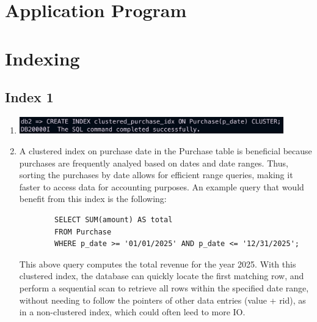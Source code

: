\documentclass[a4paper,11pt]{article}
\begin{document}
\section*{Application Program}

\section*{Indexing}

\subsection*{Index 1}

\begin{enumerate}[label=(\alph*)]
    \item \includegraphics[width=0.9\textwidth]{images/idx1.png}
    \item A clustered index on purchase date in the Purchase table is beneficial because purchases are frequently analyed based on dates and date ranges. 
    Thus, sorting the purchases by date allows for efficient range queries, making it faster to access data for accounting purposes.
    An example query that would benefit from this index is the following:
    \begin{lstlisting}
        SELECT SUM(amount) AS total 
        FROM Purchase 
        WHERE p_date >= '01/01/2025' AND p_date <= '12/31/2025';
    \end{lstlisting}
    This above query computes the total revenue for the year 2025. With this clustered index, the database can quickly locate the first matching row, and perform a sequential scan to retrieve all rows within the specified date range, without needing to follow the pointers of other data entries (value + rid), as in a non-clustered index, which could often leed to more IO.
\end{enumerate} 
\end{document}
